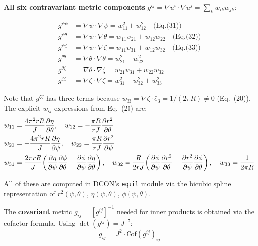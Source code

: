 \documentclass[12pt,a4paper]{article}
\begin{document}
\medskip
\noindent\textbf{All six contravariant metric components} $g^{ij} = \nabla u^i\cdot\nabla u^j = \sum_k w_{ik}w_{jk}$:

\begin{align}
    g^{\psi\psi} &= \nabla\psi\cdot\nabla\psi = w_{11}^2 + w_{12}^2
    \quad\text{(Eq.(31))} \label{eq:guu_pp}\\[4pt]
    g^{\psi\theta} &= \nabla\psi\cdot\nabla\theta = w_{11}w_{21} + w_{12}w_{22}
    \quad\text{(Eq.(32))} \label{eq:guu_pt}\\[4pt]
    g^{\psi\zeta} &= \nabla\psi\cdot\nabla\zeta = w_{11}w_{31} + w_{12}w_{32}
    \quad\text{(Eq.(33))} \label{eq:guu_pz}\\[4pt]
    g^{\theta\theta} &= \nabla\theta\cdot\nabla\theta = w_{21}^2 + w_{22}^2
    \label{eq:guu_tt}\\[4pt]
    g^{\theta\zeta} &= \nabla\theta\cdot\nabla\zeta = w_{21}w_{31} + w_{22}w_{32}
    \label{eq:guu_tz}\\[4pt]
    g^{\zeta\zeta} &= \nabla\zeta\cdot\nabla\zeta = w_{31}^2 + w_{32}^2 + w_{33}^2
    \label{eq:guu_zz}
\end{align}

Note that $g^{\zeta\zeta}$ has three terms because $w_{33} = \nabla\zeta\cdot\hat{e}_3 = 1/(2\pi R) \neq 0$ (Eq.~(20)). The explicit $w_{ij}$ expressions from Eq.~(20) are:
\begin{align}
    w_{11} &= \frac{4\pi^2 rR}{J}\frac{\partial\eta}{\partial\theta}, \quad
    w_{12} = -\frac{\pi R}{rJ}\frac{\partial r^2}{\partial\theta} \notag\\
    w_{21} &= -\frac{4\pi^2 rR}{J}\frac{\partial\eta}{\partial\psi}, \quad
    w_{22} = \frac{\pi R}{rJ}\frac{\partial r^2}{\partial\psi} \notag\\
    w_{31} &= \frac{2\pi rR}{J}\!\left(\frac{\partial\eta}{\partial\psi}\frac{\partial\phi}{\partial\theta} - \frac{\partial\phi}{\partial\psi}\frac{\partial\eta}{\partial\theta}\right), \quad
    w_{32} = \frac{R}{2rJ}\!\left(\frac{\partial\phi}{\partial\psi}\frac{\partial r^2}{\partial\theta} - \frac{\partial r^2}{\partial\psi}\frac{\partial\phi}{\partial\theta}\right), \quad
    w_{33} = \frac{1}{2\pi R}
    \label{eq:wij_explicit}
\end{align}

All of these are computed in DCON's \texttt{equil} module via the bicubic spline representation of $r^2(\psi,\theta)$, $\eta(\psi,\theta)$, $\phi(\psi,\theta)$.

\medskip
The \textbf{covariant} metric $g_{ij} = [g^{ij}]^{-1}$ needed for inner products is obtained via the cofactor formula. Using $\det(g^{ij}) = J^{-2}$:
\begin{equation}
    g_{ij} = J^2 \cdot \mathrm{Cof}(g^{ij})_{ij}
\end{equation}
\end{document}
